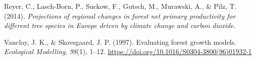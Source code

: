 \documentclass[
  12pt,
]{article}
\newlength{\cslhangindent}
\newlength{\cslentryspacingunit} %
\newenvironment{CSLReferences}[2] %
 {%
  \setlength{\parindent}{0pt}
  \ifodd #1
  \let\oldpar\par
  \def\par{\hangindent=\cslhangindent\oldpar}
  \fi
  \setlength{\parskip}{#2\cslentryspacingunit}
 }%
 {}
\begin{document}
\begin{CSLReferences}{1}{0}
\leavevmode{}%
Reyer, C., Lasch-Born, P., Suckow, F., Gutsch, M., Murawski, A., \& Pilz, T. (2014). \emph{Projections of regional changes in forest net primary productivity for different tree species in Europe driven by climate change and carbon dioxide}.

\leavevmode{}%
Vanclay, J. K., \& Skovsgaard, J. P. (1997). Evaluating forest growth models. \emph{Ecological Modelling}, \emph{98}(1), 1--12. \url{https://doi.org/10.1016/S0304-3800(96)01932-1}

\end{CSLReferences}
\end{document}
